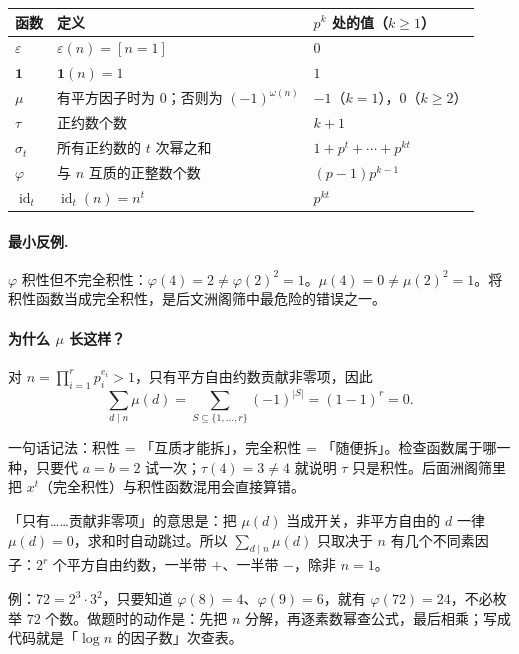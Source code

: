 \documentclass[UTF8,a4paper,11pt,twoside,openright,fontset=fandol]{ctexbook}
\theoremstyle{definition}
\newcommand{\eps}{\varepsilon}
\newcommand{\one}{\mathbf 1}
\newcommand{\id}{\operatorname{id}}
\begin{document}
\begin{longtable}{p{}p{}p{}}
\toprule
函数 & 定义 & $p^k$ 处的值（$k\ge1$）\\\midrule
$\eps$ & $\eps(n)=[n=1]$ & $0$\\
$\one$ & $\one(n)=1$ & $1$\\
$\mu$ & 有平方因子时为 $0$；否则为 $(-1)^{\omega(n)}$ & $-1$（$k=1$），$0$（$k\ge2$）\\
$\tau$ & 正约数个数 & $k+1$\\
$\sigma_t$ & 所有正约数的 $t$ 次幂之和 & $1+p^t+\cdots+p^{kt}$\\
$\varphi$ & 与 $n$ 互质的正整数个数 & $(p-1)p^{k-1}$\\
$\id_t$ & $\id_t(n)=n^t$ & $p^{kt}$\\
\bottomrule
\end{longtable}

\paragraph{最小反例.} $\varphi$ 积性但不完全积性：$\varphi(4)=2\ne\varphi(2)^2=1$。$\mu(4)=0\ne\mu(2)^2=1$。将积性函数当成完全积性，是后文洲阁筛中最危险的错误之一。
\paragraph{为什么 $\mu$ 长这样？}
对 $n=\prod_{i=1}^r p_i^{e_i}>1$，只有平方自由约数贡献非零项，因此
\[
 \sum_{d\mid n}\mu(d)=\sum_{S\subseteq\{1,\ldots,r\}}(-1)^{|S|}=(1-1)^r=0.
\]

\begin{tip}[词义：积性 / 完全积性]
一句话记法：积性 = 「互质才能拆」，完全积性 = 「随便拆」。检查函数属于哪一种，只要代 $a=b=2$ 试一次；$\tau(4)=3\ne4$ 就说明 $\tau$ 只是积性。后面洲阁筛里把 $x^t$（完全积性）与积性函数混用会直接算错。
\end{tip}

\begin{tip}[词义：把 $\mu(d)$ 当开关]
「只有……贡献非零项」的意思是：把 $\mu(d)$ 当成开关，非平方自由的 $d$ 一律 $\mu(d)=0$，求和时自动跳过。所以 $\sum_{d\mid n}\mu(d)$ 只取决于 $n$ 有几个不同素因子：$2^r$ 个平方自由约数，一半带 $+$、一半带 $-$，除非 $n=1$。
\end{tip}

\begin{tip}
例：$72=2^3\cdot3^2$，只要知道 $\varphi(8)=4$、$\varphi(9)=6$，就有 $\varphi(72)=24$，不必枚举 $72$ 个数。做题时的动作是：先把 $n$ 分解，再逐素数幂查公式，最后相乘；写成代码就是「$\log n$ 的因子数」次查表。
\end{tip}
\end{document}

